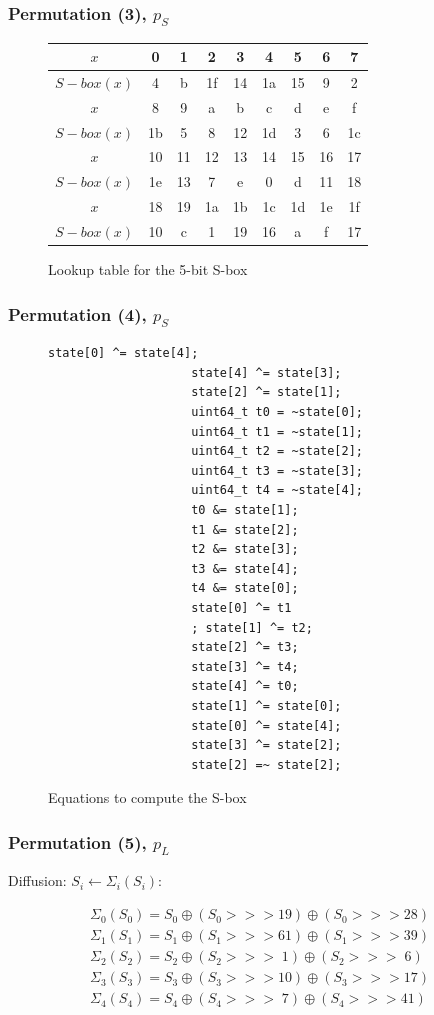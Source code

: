 \documentclass{beamer}
\begin{document}
	
		
	\begin{frame}
		\frametitle{Permutation (3), $p_S$}
		
			\begin{figure}[h]
				\small
				\centering
				\begin{tabular}{|c||*{8}{c|}}
					\hline
					$x$&0&1&2&3&4&5&6&7\\
					\hline
					$S-box(x)$&4&b&1f&14&1a&15&9&2\\
					\hline\hline
					$x$&8&9&a&b&c&d&e&f\\
					\hline
					$S-box(x)$&1b&5&8&12&1d&3&6&1c\\
					\hline\hline
					$x$&10&11&12&13&14&15&16&17\\
					\hline
					$S-box(x)$&1e&13&7&e&0&d&11&18\\
					\hline\hline
					$x$&18&19&1a&1b&1c&1d&1e&1f\\
					\hline
					$S-box(x)$&10&c&1&19&16&a&f&17\\
					\hline
				\end{tabular}
				\caption{Lookup table for the 5-bit S-box}
				\label{lookup_sbox}
			\end{figure}
	\end{frame}
		
	\begin{frame}[fragile]	
	\frametitle{Permutation (4), $p_S$}
			\begin{figure}[H]
				\begin{lstlisting}[style=CStyle]
					state[0] ^= state[4];
					state[4] ^= state[3];
					state[2] ^= state[1];
					uint64_t t0 = ~state[0];
					uint64_t t1 = ~state[1];
					uint64_t t2 = ~state[2];
					uint64_t t3 = ~state[3];
					uint64_t t4 = ~state[4];
					t0 &= state[1];
					t1 &= state[2];
					t2 &= state[3];
					t3 &= state[4];
					t4 &= state[0];
					state[0] ^= t1
					; state[1] ^= t2;
					state[2] ^= t3;
					state[3] ^= t4;
					state[4] ^= t0;
					state[1] ^= state[0];
					state[0] ^= state[4];
					state[3] ^= state[2];
					state[2] =~ state[2];
				\end{lstlisting}
				\caption{Equations to compute the S-box}
				\label{equations_sbox}
			\end{figure}
			
	\end{frame}
		
	\begin{frame}
		\frametitle{Permutation (5), $p_L$}
		Diffusion: $S_i \leftarrow \Sigma_i(S_i)$:
		
		\begin{gather*}
			\Sigma_0(S_0) = S_0 \oplus (S_0 >>> 19) \oplus (S_0 >>> 28)\\
			\Sigma_1(S_1) = S_1 \oplus (S_1 >>> 61) \oplus (S_1 >>> 39)\\
			\Sigma_2(S_2) = S_2 \oplus (S_2 >>> \;  1) \oplus (S_2 >>> \; 6)\\
			\Sigma_3(S_3) = S_3 \oplus (S_3 >>> 10) \oplus (S_3 >>> 17)\\
			\Sigma_4(S_4) = S_4 \oplus (S_4 >>> \; 7) \oplus (S_4 >>> 41)\\
		\end{gather*}
	\end{frame}		
	
\end{document}
